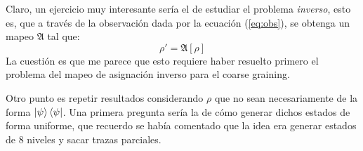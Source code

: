 \documentclass{article}
\begin{document}
Claro, un ejercicio muy interesante sería el de estudiar el problema \textit{inverso}, esto es, que a través de la observación dada por la ecuación (\ref{eq:obs}), se obtenga un mapeo $\mathfrak{A}$ tal que:
\begin{equation}
    \rho'=\mathfrak{A}\left[\rho\right]
\end{equation}
La cuestión es que me parece que esto requiere haber resuelto primero el problema del mapeo de asignación inverso para el coarse graining.



Otro punto es repetir resultados considerando $\rho$ que no sean necesariamente de la forma $\ket{\psi}\bra{\psi}$. Una primera pregunta sería la de cómo generar dichos estados de forma uniforme, que recuerdo se había comentado que la idea era generar estados de 8 niveles y sacar trazas parciales.
\end{document}
